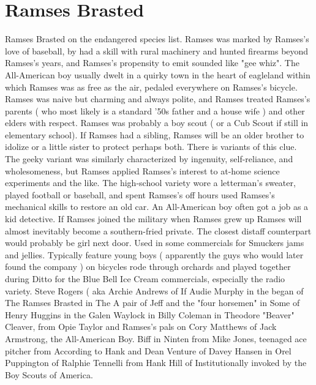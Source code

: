 \documentclass[12pt]{book}
\begin{document}
\chapter{Ramses Brasted}
Ramses Brasted on the endangered species list. Ramses was marked by Ramses's love of baseball, by had a skill with rural machinery and hunted firearms beyond Ramses's years, and Ramses's propensity to emit sounded like "gee whiz". The All-American boy usually dwelt in a quirky town in the heart of eagleland within which Ramses was as free as the air, pedaled everywhere on Ramses's bicycle. Ramses was naive but charming and always polite, and Ramses treated Ramses's parents ( who most likely is a standard '50s father and a house wife ) and other elders with respect. Ramses was probably a boy scout ( or a Cub Scout if still in elementary school). If Ramses had a sibling, Ramses will be an older brother to idolize or a little sister to protect  perhaps both. There is variants of this clue. The geeky variant was similarly characterized by ingenuity, self-reliance, and wholesomeness, but Ramses applied Ramses's interest to at-home science experiments and the like. The high-school variety wore a letterman's sweater, played football or baseball, and spent Ramses's off hours used Ramses's mechanical skills to restore an old car. An All-American boy often got a job as a kid detective. If Ramses joined the military when Ramses grew up Ramses will almost inevitably become a southern-fried private. The closest distaff counterpart would probably be girl next door. Used in some commercials for Smuckers jams and jellies. Typically feature young boys ( apparently the guys who would later found the company ) on bicycles rode through orchards and played together during Ditto for the Blue Bell Ice Cream commercials, especially the radio variety. Steve Rogers ( aka Archie Andrews of If Audie Murphy in the began of The Ramses Brasted in The A pair of Jeff and the "four horsemen" in Some of Henry Huggins in the Galen Waylock in Billy Coleman in Theodore "Beaver" Cleaver, from Opie Taylor and Ramses's pals on Cory Matthews of Jack Armstrong, the All-American Boy. Biff in Ninten from Mike Jones, teenaged ace pitcher from According to Hank and Dean Venture of Davey Hansen in Orel Puppington of Ralphie Tennelli from Hank Hill of Institutionally invoked by the Boy Scouts of America.
\end{document}
